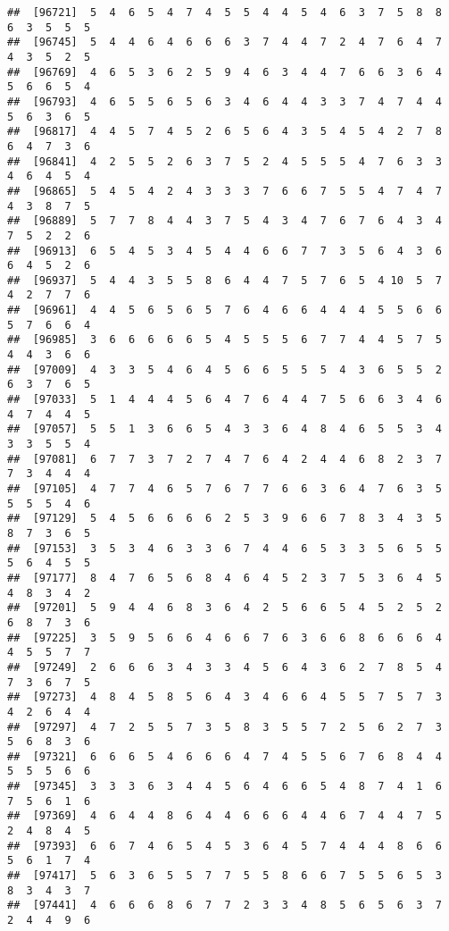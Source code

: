 \documentclass[
]{book}
\begin{document}
\begin{verbatim}
##  [96721]  5  4  6  5  4  7  4  5  5  4  4  5  4  6  3  7  5  8  8  6  3  5  5  5
##  [96745]  5  4  4  6  4  6  6  6  3  7  4  4  7  2  4  7  6  4  7  4  3  5  2  5
##  [96769]  4  6  5  3  6  2  5  9  4  6  3  4  4  7  6  6  3  6  4  5  6  6  5  4
##  [96793]  4  6  5  5  6  5  6  3  4  6  4  4  3  3  7  4  7  4  4  5  6  3  6  5
##  [96817]  4  4  5  7  4  5  2  6  5  6  4  3  5  4  5  4  2  7  8  6  4  7  3  6
##  [96841]  4  2  5  5  2  6  3  7  5  2  4  5  5  5  4  7  6  3  3  4  6  4  5  4
##  [96865]  5  4  5  4  2  4  3  3  3  7  6  6  7  5  5  4  7  4  7  4  3  8  7  5
##  [96889]  5  7  7  8  4  4  3  7  5  4  3  4  7  6  7  6  4  3  4  7  5  2  2  6
##  [96913]  6  5  4  5  3  4  5  4  4  6  6  7  7  3  5  6  4  3  6  6  4  5  2  6
##  [96937]  5  4  4  3  5  5  8  6  4  4  7  5  7  6  5  4 10  5  7  4  2  7  7  6
##  [96961]  4  4  5  6  5  6  5  7  6  4  6  6  4  4  4  5  5  6  6  5  7  6  6  4
##  [96985]  3  6  6  6  6  6  5  4  5  5  5  6  7  7  4  4  5  7  5  4  4  3  6  6
##  [97009]  4  3  3  5  4  6  4  5  6  6  5  5  5  4  3  6  5  5  2  6  3  7  6  5
##  [97033]  5  1  4  4  4  5  6  4  7  6  4  4  7  5  6  6  3  4  6  4  7  4  4  5
##  [97057]  5  5  1  3  6  6  5  4  3  3  6  4  8  4  6  5  5  3  4  3  3  5  5  4
##  [97081]  6  7  7  3  7  2  7  4  7  6  4  2  4  4  6  8  2  3  7  7  3  4  4  4
##  [97105]  4  7  7  4  6  5  7  6  7  7  6  6  3  6  4  7  6  3  5  5  5  5  4  6
##  [97129]  5  4  5  6  6  6  6  2  5  3  9  6  6  7  8  3  4  3  5  8  7  3  6  5
##  [97153]  3  5  3  4  6  3  3  6  7  4  4  6  5  3  3  5  6  5  5  5  6  4  5  5
##  [97177]  8  4  7  6  5  6  8  4  6  4  5  2  3  7  5  3  6  4  5  4  8  3  4  2
##  [97201]  5  9  4  4  6  8  3  6  4  2  5  6  6  5  4  5  2  5  2  6  8  7  3  6
##  [97225]  3  5  9  5  6  6  4  6  6  7  6  3  6  6  8  6  6  6  4  4  5  5  7  7
##  [97249]  2  6  6  6  3  4  3  3  4  5  6  4  3  6  2  7  8  5  4  7  3  6  7  5
##  [97273]  4  8  4  5  8  5  6  4  3  4  6  6  4  5  5  7  5  7  3  4  2  6  4  4
##  [97297]  4  7  2  5  5  7  3  5  8  3  5  5  7  2  5  6  2  7  3  5  6  8  3  6
##  [97321]  6  6  6  5  4  6  6  6  4  7  4  5  5  6  7  6  8  4  4  5  5  5  6  6
##  [97345]  3  3  3  6  3  4  4  5  6  4  6  6  5  4  8  7  4  1  6  7  5  6  1  6
##  [97369]  4  6  4  4  8  6  4  4  6  6  6  4  4  6  7  4  4  7  5  2  4  8  4  5
##  [97393]  6  6  7  4  6  5  4  5  3  6  4  5  7  4  4  4  8  6  6  5  6  1  7  4
##  [97417]  5  6  3  6  5  5  7  7  5  5  8  6  6  7  5  5  6  5  3  8  3  4  3  7
##  [97441]  4  6  6  6  8  6  7  7  2  3  3  4  8  5  6  5  6  3  7  2  4  4  9  6

\end{verbatim}
\end{document}
